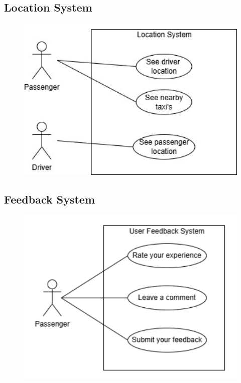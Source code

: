 \documentclass[a4paper,12pt]{article}
\begin{document}
    \subsection*{Location System}
    \begin{figure}[H]
      \centering
      \includegraphics[width=1\textwidth]{Location System.jpg} 
    \end{figure}
   
  \subsection*{Feedback System}
    \begin{figure}[H]
      \centering
      \includegraphics[width=1\textwidth]{UserFeedback.png} 
    \end{figure}
\end{document}
